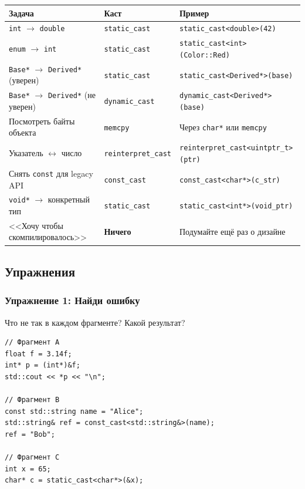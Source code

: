 \documentclass[a4paper,12pt]{article}
\begin{document}
\begin{center}
\begin{tabular}{lll}
\toprule
\textbf{Задача} & \textbf{Каст} & \textbf{Пример} \\
\midrule
\texttt{int} $\to$ \texttt{double}
    & \texttt{static\_cast}
    & \texttt{static\_cast<double>(42)} \\
\addlinespace
\texttt{enum} $\to$ \texttt{int}
    & \texttt{static\_cast}
    & \texttt{static\_cast<int>(Color::Red)} \\
\addlinespace
\texttt{Base*} $\to$ \texttt{Derived*} (уверен)
    & \texttt{static\_cast}
    & \texttt{static\_cast<Derived*>(base)} \\
\addlinespace
\texttt{Base*} $\to$ \texttt{Derived*} (не уверен)
    & \texttt{dynamic\_cast}
    & \texttt{dynamic\_cast<Derived*>(base)} \\
\addlinespace
Посмотреть байты объекта
    & \texttt{memcpy}
    & Через \texttt{char*} или \texttt{memcpy} \\
\addlinespace
Указатель $\leftrightarrow$ число
    & \texttt{reinterpret\_cast}
    & \texttt{reinterpret\_cast<uintptr\_t>(ptr)} \\
\addlinespace
Снять \texttt{const} для legacy API
    & \texttt{const\_cast}
    & \texttt{const\_cast<char*>(c\_str)} \\
\addlinespace
\texttt{void*} $\to$ конкретный тип
    & \texttt{static\_cast}
    & \texttt{static\_cast<int*>(void\_ptr)} \\
\addlinespace
<<Хочу чтобы скомпилировалось>>
    & \textbf{Ничего}
    & Подумайте ещё раз о дизайне \\
\bottomrule
\end{tabular}
\end{center}

\subsection{Упражнения}

\subsubsection{Упражнение 1: Найди ошибку}

Что не так в каждом фрагменте? Какой результат?

\begin{lstlisting}
// Фрагмент A
float f = 3.14f;
int* p = (int*)&f;
std::cout << *p << "\n";

// Фрагмент B
const std::string name = "Alice";
std::string& ref = const_cast<std::string&>(name);
ref = "Bob";

// Фрагмент C
int x = 65;
char* c = static_cast<char*>(&x);
\end{lstlisting}
\end{document}
